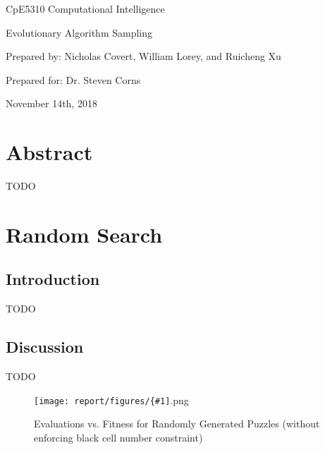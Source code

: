 \documentclass[11pt]{article}
\newcommand{\addgraphic}[1]{\centerline{\texttt{[image: report/figures/\{\#1]}.png}}}
\begin{document}
\thispagestyle{empty}
\begin{center}
\begin{minipage}{0.75\linewidth}
\centering

\vspace{6.2cm}

{\Large CpE5310 Computational Intelligence\par}
\vspace{0.2cm}

{\large Evolutionary Algorithm Sampling\par}
\vspace{3cm}

{\large Prepared by: Nicholas Covert, William Lorey, and Ruicheng Xu\par}
\vspace{0.2cm}

{\large Prepared for: Dr. Steven Corns}
\vspace{3cm}

{\large November 14th, 2018}

\end{minipage}
\end{center}

\clearpage

\tableofcontents

\clearpage


\section{Abstract}

TODO


\section{Random Search}

\subsection{Introduction}

TODO


\subsection{Discussion}

TODO


\begin{figure}[H]
    \addgraphic{random_gen_soln_graph}
    \caption{Evaluations vs. Fitness for Randomly Generated Puzzles (without enforcing black cell number constraint)}
    \label{fig:rand_search_rand}
\end{figure}
\end{document}
